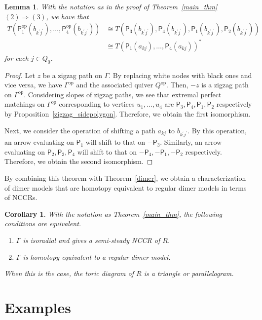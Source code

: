 \documentclass[11pt]{amsart}
\newtheorem{lemm}[theo]{Lemma}
\newtheorem{coro}[theo]{Corollary}
\theoremstyle{definition}
\newcommand{\sfP}{\mathsf{P}}
\DeclareMathOperator{\op}{op}
\begin{document}
\begin{lemm}\label{key_lem}
With the notation as in the proof of Theorem~\ref{main_thm} $(2)\Rightarrow(3)$, we have that
\begin{align*}
T(\sfP^{\op}_1(b_{k^\prime j^\prime}),\dots,\sfP^{\op}_4(b_{k^\prime j^\prime})) &\cong T(\sfP_3(b_{k^\prime j^\prime}),\sfP_4(b_{k^\prime j^\prime}),\sfP_1(b_{k^\prime j^\prime}),\sfP_2(b_{k^\prime j^\prime}))\\
&\cong T(\sfP_1(a_{kj}),\dots,\sfP_4(a_{kj}))^*
\end{align*}
for each $j\in Q_0$.
\end{lemm}

\begin{proof}
Let $z$ be a zigzag path on $\Gamma$. By replacing white nodes with black ones and vice versa, we have $\Gamma^{\op}$ and the associated quiver $Q^{\op}$. Then, $-z$ is a zigzag path on $\Gamma^{\op}$. Considering slopes of zigzag paths, we see that extremal perfect matchings on $\Gamma^{\op}$ corresponding to vertices $u_1,\dots,u_4$ are $\sfP_3, \sfP_4,\sfP_1,\sfP_2$ respectively by Proposition~\ref{zigzag_sidepolygon}. Therefore, we obtain the first isomorphism.

Next, we consider the operation of shifting a path $a_{kj}$ to $b_{k^\prime j^\prime}$. By this operation, an arrow evaluating on $\sfP_1$ will shift to that on $-\sfP_3$. Similarly, an arrow evaluating on $\sfP_2,\sfP_3,\sfP_4$ will shift to that on $-\sfP_4,-\sfP_1,-\sfP_2$ respectively. Therefore, we obtain the second isomorphism.
\end{proof}

By combining this theorem with Theorem~\ref{dimer}, we obtain a characterization of dimer models that are homotopy equivalent to regular dimer models in terms of NCCRs.

\begin{coro}\label{main_cor}
With the notation as Theorem~\ref{main_thm}, the following conditions are equivalent.
\begin{enumerate}[\rm (1)]
\item $\Gamma$ is isoradial and gives a semi-steady NCCR of $R$.
\item $\Gamma$ is homotopy equivalent to a regular dimer model.
\end{enumerate}
When this is the case, the toric diagram of $R$ is a triangle or parallelogram.
\end{coro}


\section{Examples}\label{subsec_ex}
\end{document}
